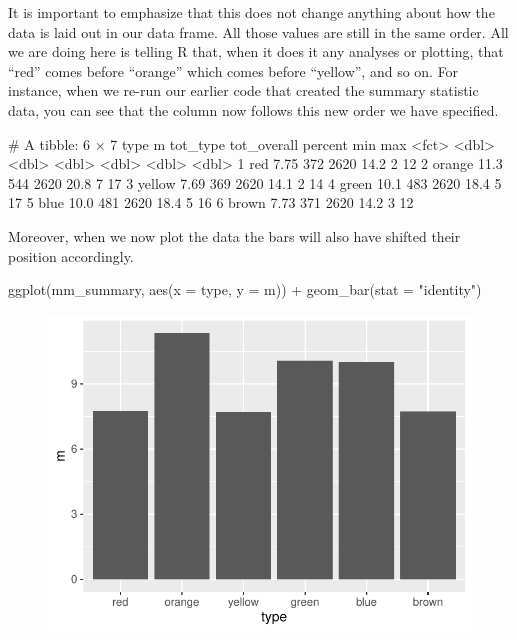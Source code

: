 It is important to emphasize that this does not change anything about how the data is laid out in our data frame. All those values are still in the same order. All we are doing here is telling R that, when it does it any analyses or plotting, that ``red'' comes before ``orange'' which comes before ``yellow'', and so on. For instance, when we re-run our earlier code that created the summary statistic data, you can see that the  column now follows this new order we have specified.


\begin{outR}
# A tibble: 6 × 7
  type       m tot_type tot_overall percent   min   max
  <fct>  <dbl>    <dbl>       <dbl>   <dbl> <dbl> <dbl>
1 red     7.75      372        2620    14.2     2    12
2 orange 11.3       544        2620    20.8     7    17
3 yellow  7.69      369        2620    14.1     2    14
4 green  10.1       483        2620    18.4     5    17
5 blue   10.0       481        2620    18.4     5    16
6 brown   7.73      371        2620    14.2     3    12
\end{outR}

\noindent

Moreover, when we now plot the data the bars will also have shifted their position accordingly.

\begin{inR}
ggplot(mm_summary, aes(x = type, y = m)) +
  geom_bar(stat = "identity")
\end{inR}

\vspace{2em}

\begin{figure}[H]
\includegraphics[scale = .75]{graphics/ch3Figs/bar_5.pdf}
\end{figure}

